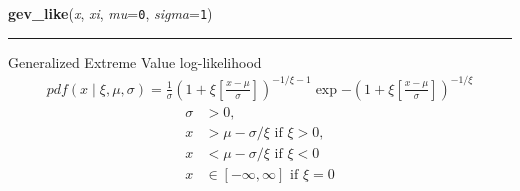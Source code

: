 \hspace{.8\funcindent}\begin{boxedminipage}{\funcwidth}

    \raggedright \textbf{gev\_like}(\textit{x}, \textit{xi}, \textit{mu}={\tt 0}, \textit{sigma}={\tt 1})

    \vspace{-1.5ex}

    \rule{\textwidth}{1pt}
\setlength{\parskip}{2ex}

Generalized Extreme Value log-likelihood
\begin{equation*}\begin{split}pdf(x \mid \xi,\mu,\sigma) = \frac{1}{\sigma}(1 + \xi \left[\frac{x-\mu}{\sigma}\right])^{-1/\xi-1}\exp{-(1+\xi \left[\frac{x-\mu}{\sigma}\right])^{-1/\xi}}\end{split}\end{equation*}\begin{equation*}\begin{split}\sigma & > 0,\\x & > \mu-\sigma/\xi \text{ if } \xi > 0,\\x & < \mu-\sigma/\xi \text{ if } \xi < 0\\x & \in [-\infty,\infty] \text{ if } \xi = 0\end{split}\end{equation*}\setlength{\parskip}{1ex}
    \end{boxedminipage}

    \label{pymc:distributions:half_normal_like}

    \vspace{0.5ex}

